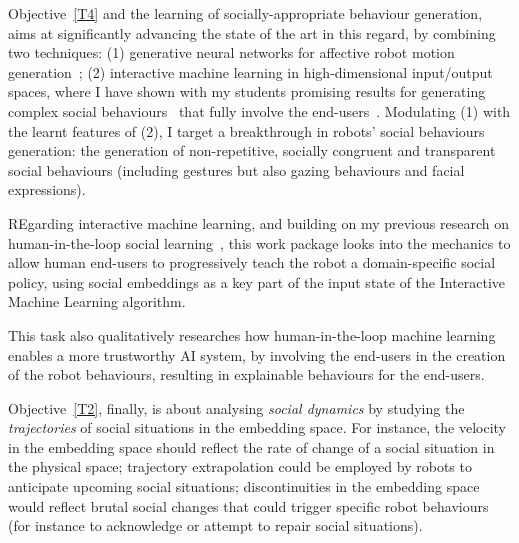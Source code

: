 

Objective~\ref{T4} and the learning of socially-appropriate behaviour
generation, \project aims at significantly advancing the state of the art in
this regard, by combining two techniques: (1) generative neural networks
for affective robot motion
generation~\cite{marmpena2019generating,suguitan2020moveae}; (2) interactive
machine learning in high-dimensional input/output spaces, where I have shown
with my students promising results for generating complex social
behaviours~\cite{senft2019teaching, winkle2020couch} that fully involve the
end-users~\cite{winkle2018social}. Modulating (1) with the learnt features of
(2), I target a breakthrough in robots' social behaviours generation: the
generation of non-repetitive, socially congruent and transparent social
behaviours (including gestures but also gazing behaviours and facial
expressions).

REgarding interactive machine learning, and building on my previous research on human-in-the-loop social
learning~\cite{senft2017supervised, senft2019teaching,
winkle2020couch,winkle2021leador}, this work package looks into the mechanics to
allow human end-users to progressively teach the robot a domain-specific social
policy, using social embeddings as a key part of the input state of the
Interactive Machine Learning algorithm.

This task also qualitatively researches how human-in-the-loop machine
learning enables a more trustworthy AI system, by involving the end-users in the
creation of the robot behaviours, resulting in explainable behaviours for the
end-users.



Objective~\ref{T2}, finally, is about analysing \emph{social dynamics} by
studying the \emph{trajectories} of social situations in the embedding space.
For instance, the velocity in the embedding space should reflect the rate of
change of a social situation in the physical space; trajectory extrapolation
could be employed by robots to anticipate upcoming social situations;
discontinuities in the embedding space would reflect brutal social changes that
could trigger specific robot behaviours (for instance to acknowledge or attempt
to repair social situations).


